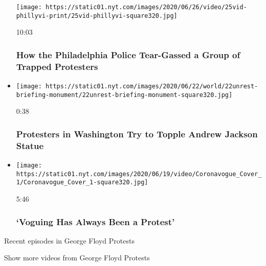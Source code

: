 \begin{itemize}
  \texttt{[image: https://static01.nyt.com/images/2020/06/26/video/25vid-phillyvi-print/25vid-phillyvi-square320.jpg]}

  10:03

  \hypertarget{how-the-philadelphia-police-tear-gassed-a-group-of-trapped-protesters}{%
  \subsubsection{How the Philadelphia Police Tear-Gassed a Group of
  Trapped
  Protesters}\label{how-the-philadelphia-police-tear-gassed-a-group-of-trapped-protesters}}
\item
  \href{https://www.nytimes.com/video/us/100000007205037/washington-protests-andrew-jackson-statue.html?action=click\&module=video-series-bar\&region=header\&pgtype=Article\&playlistId=video/minneapolis-george-floyd-death-video}{}

  \texttt{[image: https://static01.nyt.com/images/2020/06/22/world/22unrest-briefing-monument/22unrest-briefing-monument-square320.jpg]}

  0:38

  \hypertarget{protesters-in-washington-try-to-topple-andrew-jackson-statue}{%
  \subsubsection{Protesters in Washington Try to Topple Andrew Jackson
  Statue}\label{protesters-in-washington-try-to-topple-andrew-jackson-statue}}
\item
  \href{https://www.nytimes.com/video/arts/100000007180242/voguing-protests.html?action=click\&module=video-series-bar\&region=header\&pgtype=Article\&playlistId=video/minneapolis-george-floyd-death-video}{}

  \texttt{[image: https://static01.nyt.com/images/2020/06/19/video/Coronavogue\_Cover\_1/Coronavogue\_Cover\_1-square320.jpg]}

  5:46

  \hypertarget{voguing-has-always-been-a-protest}{%
  \subsubsection{`Voguing Has Always Been a
  Protest'}\label{voguing-has-always-been-a-protest}}
\end{itemize}

Recent episodes in George Floyd Protests

Show more videos from George Floyd Protests

